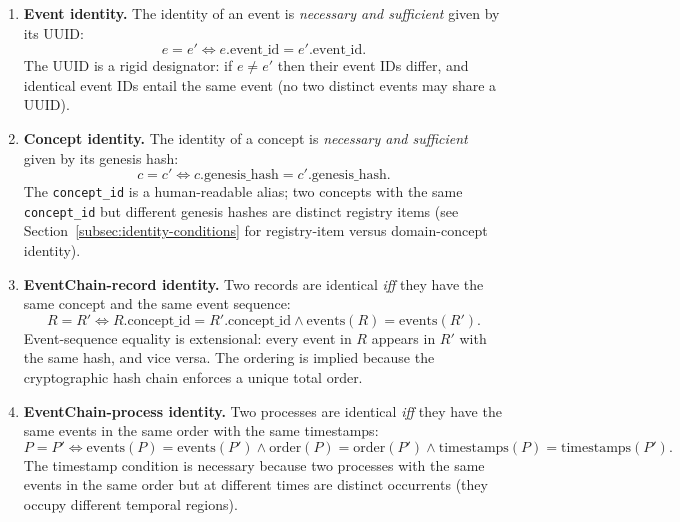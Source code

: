 \begin{enumerate}[label=Axiom I\arabic*:,leftmargin=3em]
    \item \textbf{Event identity.} The identity of an event is \emph{necessary and sufficient} given by its UUID:
    \begin{equation}\label{eq:i1}
        e = e' \iff e.\text{event\_id} = e'.\text{event\_id}.
    \end{equation}
    The UUID is a rigid designator: if $e \neq e'$ then their event IDs differ, and identical event IDs entail the same event (no two distinct events may share a UUID).
    
    \item \textbf{Concept identity.} The identity of a concept is \emph{necessary and sufficient} given by its genesis hash:
    \begin{equation}\label{eq:i2}
        c = c' \iff c.\text{genesis\_hash} = c'.\text{genesis\_hash}.
    \end{equation}
    The \texttt{concept\_id} is a human-readable alias; two concepts with the same \texttt{concept\_id} but different genesis hashes are distinct registry items (see Section~\ref{subsec:identity-conditions} for registry-item versus domain-concept identity).
    
    \item \textbf{EventChain-record identity.} Two records are identical \emph{iff} they have the same concept and the same event sequence:
    \begin{equation}\label{eq:i3}
        R = R' \iff R.\text{concept\_id} = R'.\text{concept\_id} \land \text{events}(R) = \text{events}(R').
    \end{equation}
    Event-sequence equality is extensional: every event in $R$ appears in $R'$ with the same hash, and vice versa. The ordering is implied because the cryptographic hash chain enforces a unique total order.
    
    \item \textbf{EventChain-process identity.} Two processes are identical \emph{iff} they have the same events in the same order with the same timestamps:
    \begin{equation}\label{eq:i4}
        P = P' \iff \text{events}(P) = \text{events}(P') \land \text{order}(P) = \text{order}(P') \land \text{timestamps}(P) = \text{timestamps}(P').
    \end{equation}
    The timestamp condition is necessary because two processes with the same events in the same order but at different times are distinct occurrents (they occupy different temporal regions).
\end{enumerate}

